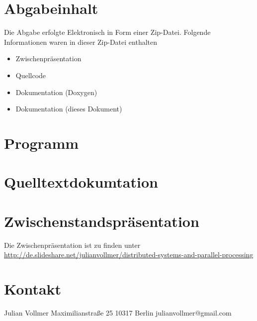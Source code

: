 
\section{Abgabeinhalt}
Die Abgabe erfolgte Elektronisch in Form einer Zip-Datei. Folgende Informationen waren in dieser Zip-Datei enthalten 
\begin{itemize}
	\item Zwischenpräsentation
	\item Quellcode 
	\item Dokumentation (Doxygen)
	\item Dokumentation (dieses Dokument)

\end{itemize}

\section{Programm}

\section{Quelltextdokumtation}

\section{Zwischenstandspräsentation}
Die Zwischenpräsentation ist zu finden unter \url{http://de.slideshare.net/julianvollmer/distributed-systems-and-parallel-processing} 
\section{Kontakt}
Julian Vollmer
Maximilianstraße 25
10317 Berlin
julianvollmer@gmail.com